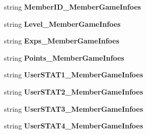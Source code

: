 \begin{DoxyCompactItemize}
\item 
string {\bfseries Member\+I\+D\+\_\+\+Member\+Game\+Infoes}\hypertarget{a00124_a994cce6f64d285ddc34b6d53f66e0fb3}{}\label{a00124_a994cce6f64d285ddc34b6d53f66e0fb3}

\item 
string {\bfseries Level\+\_\+\+Member\+Game\+Infoes}\hypertarget{a00124_a12c8264473eb0a2ac15a681ec7aaffea}{}\label{a00124_a12c8264473eb0a2ac15a681ec7aaffea}

\item 
string {\bfseries Exps\+\_\+\+Member\+Game\+Infoes}\hypertarget{a00124_a59bce089c110a23cdde3bbb2ba0c3851}{}\label{a00124_a59bce089c110a23cdde3bbb2ba0c3851}

\item 
string {\bfseries Points\+\_\+\+Member\+Game\+Infoes}\hypertarget{a00124_af65e108fbeb75960d8cf495f1cdfa65f}{}\label{a00124_af65e108fbeb75960d8cf495f1cdfa65f}

\item 
string {\bfseries User\+S\+T\+A\+T1\+\_\+\+Member\+Game\+Infoes}\hypertarget{a00124_a259db76a50bd5d427a87355322ca0d66}{}\label{a00124_a259db76a50bd5d427a87355322ca0d66}

\item 
string {\bfseries User\+S\+T\+A\+T2\+\_\+\+Member\+Game\+Infoes}\hypertarget{a00124_aeb2e34273d8c6054ff25c485c10f493b}{}\label{a00124_aeb2e34273d8c6054ff25c485c10f493b}

\item 
string {\bfseries User\+S\+T\+A\+T3\+\_\+\+Member\+Game\+Infoes}\hypertarget{a00124_a111978aa4bb3ba292db6fd8cb8f93068}{}\label{a00124_a111978aa4bb3ba292db6fd8cb8f93068}

\item 
string {\bfseries User\+S\+T\+A\+T4\+\_\+\+Member\+Game\+Infoes}\hypertarget{a00124_a0b6d89d6c8ec18aa2bdd429b8c0fdecc}{}\label{a00124_a0b6d89d6c8ec18aa2bdd429b8c0fdecc}


\end{DoxyCompactItemize}
